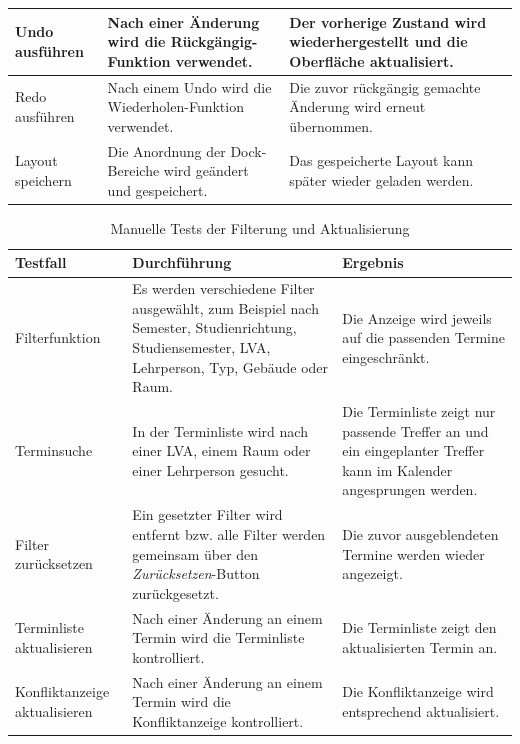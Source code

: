 \documentclass[12pt,a4paper]{article}
\begin{document}
\begin{table}[H]
\begin{tabularx}{\textwidth}{|L{3cm}|Y|Y|}
\hline
Undo ausführen & Nach einer Änderung wird die Rückgängig-Funktion verwendet. & Der vorherige Zustand wird wiederhergestellt und die Oberfläche aktualisiert. \\
\hline
Redo ausführen & Nach einem Undo wird die Wiederholen-Funktion verwendet. & Die zuvor rückgängig gemachte Änderung wird erneut übernommen. \\
\hline
Layout speichern & Die Anordnung der Dock-Bereiche wird geändert und gespeichert. & Das gespeicherte Layout kann später wieder geladen werden. \\
\hline
\end{tabularx}
\end{table}

\begin{table}[H]
\centering
\small
\caption{Manuelle Tests der Filterung und Aktualisierung}
\label{tab:test-filter}
\begin{tabularx}{\textwidth}{|L{3cm}|Y|Y|}
\hline
\textbf{Testfall} & \textbf{Durchführung} & \textbf{Ergebnis} \\
\hline
Filterfunktion & Es werden verschiedene Filter ausgewählt, zum Beispiel nach Semester, Studienrichtung, Studiensemester, LVA, Lehrperson, Typ, Gebäude oder Raum. & Die Anzeige wird jeweils auf die passenden Termine eingeschränkt. \\
\hline
Terminsuche & In der Terminliste wird nach einer LVA, einem Raum oder einer Lehrperson gesucht. & Die Terminliste zeigt nur passende Treffer an und ein eingeplanter Treffer kann im Kalender angesprungen werden. \\
\hline
Filter zurücksetzen & Ein gesetzter Filter wird entfernt bzw. alle Filter werden gemeinsam über den \textit{Zurücksetzen}-Button zurückgesetzt. & Die zuvor ausgeblendeten Termine werden wieder angezeigt. \\
\hline
Terminliste aktualisieren & Nach einer Änderung an einem Termin wird die Terminliste kontrolliert. & Die Terminliste zeigt den aktualisierten Termin an. \\
\hline
Konfliktanzeige aktualisieren & Nach einer Änderung an einem Termin wird die Konfliktanzeige kontrolliert. & Die Konfliktanzeige wird entsprechend aktualisiert. \\
\hline
\end{tabularx}
\end{table}
\end{document}
